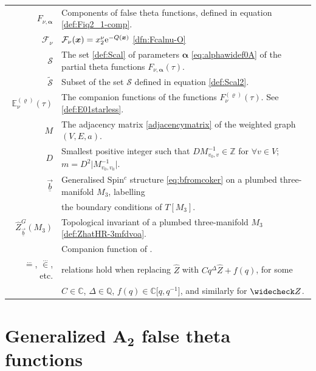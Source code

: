 \documentclass[pdftex]{sigma}
\def\BE{\mathbb{E}}
\def\CF{\mathcal{F}}
\def\CS{\mathcal{S}}
\def\ss{ \tilde{\mathcal{S}} }
\newcommand{\CC}{\mathbb{C}}
\newcommand{\QQ}{\mathbb{Q}}
\def\bos{\varrho}
\def\bal{\boldsymbol{\alpha}}
\theoremstyle{definition}
\numberwithin{equation}{section}
\begin{document}
\begin{table}[!ht]
\begin{tabular}{r l}
 $F_{\nu,\bal}$ & Components of false theta functions, defined in equation \eqref{def:Fiq2_1-comp}.
		\\
 $\CF_\nu$ & $\CF_\nu(\boldsymbol{x})=x_2^\nu {\rm e}^{-Q(\boldsymbol{x})}$ \eqref{dfn:Fcalnu-O} \\
		$\CS$ & The set \eqref{def:Scal} of parameters $\bal$ \eqref{eq:alphawidef0A} of the partial theta functions $F_{\nu,\bal}(\tau)$. \\
 $\ss$ & Subset of the set $\CS$ defined in equation \eqref{def:Scal2}.
		\\
		$\BE_\nu^{(\bos)}(\tau)$ & The companion functions of the functions $F_\nu^{(\bos)}(\tau)$. See \eqref{def:E01starless}.
 \\
		$M$ & The adjacency matrix \eqref{adjacencymatrix} of the weighted graph $(V,E,a)$.
		\\
		$D$ & Smallest positive integer such that $D M^{-1}_{v_0,v}\in\mathbb{Z}$ for $\forall  v\in V$; $m=D^2 \big|M^{-1}_{v_0,v_0}\big|$.
		\\
		$\vec{\underline{b}}$ & Generalised Spin$^c$ structure \eqref{eq:bfromcoker} on a plumbed three-manifold $M_3$, labelling \\
 & the boundary conditions of $T[M_3]$.
 \\
		$\widehat{Z}_{\vec{\underline{b}}}^G(M_3)$ & Topological invariant of a plumbed three-manifold $M_3$ \eqref{def:ZhatHR-3mfdvoa}.
		\\		\smash{$\widecheck{Z}_{\vec{\underline{b}}}^G(M_3)$} & Companion function of \smash{$\widehat{Z}_{\vec{\underline{b}}}^G(M_3)$}. \\
 $\stackrel{\dots}{=}$, $\stackrel{\dots}{\in}$, etc. & relations hold when replacing $\widehat Z$ with $Cq^{\Delta}\widehat Z+f(q)$, for some \\
 & $C\in \CC$, $\Delta\in \QQ$, $f(q)\in \CC\big[q,q^{-1}\big]$, and similarly for $\widecheck Z$.
	\end{tabular}
\end{table}

\section[Generalized A\_2 false theta functions]{Generalized $\boldsymbol{A_2}$ false theta functions}\label{sec:gena2}
\end{document}

